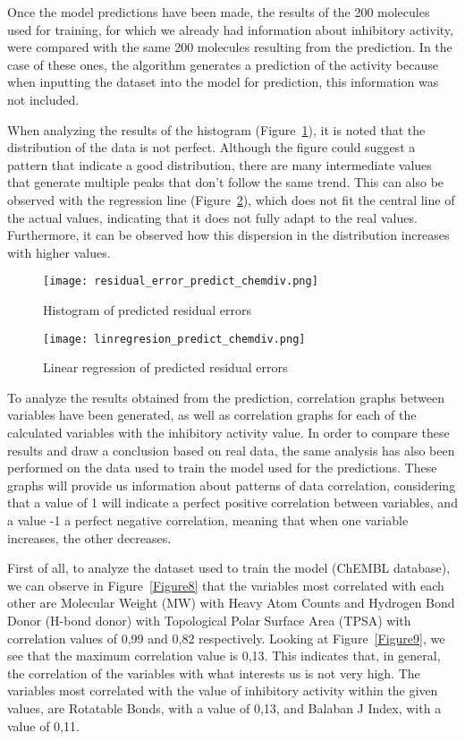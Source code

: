 \documentclass[final,times,twocolumn,article]{elsarticle}
\begin{document}
Once the model predictions have been made, the results of the 200 molecules used for training, for which we already had information about inhibitory activity, were compared with the same 200 molecules resulting from the prediction. In the case of these ones, the algorithm generates a prediction of the activity because when inputting the dataset into the model for prediction, this information was not included. 

When analyzing the results of the histogram (Figure~\ref{Figure6}), it is noted that the distribution of the data is not perfect. Although the figure could suggest a pattern that indicate a good distribution, there are many intermediate values that generate multiple peaks that don't follow the same trend. This can also be observed with the regression line (Figure~\ref{Figure7}), which does not fit the central line of the actual values, indicating that it does not fully adapt to the real values. Furthermore, it can be observed how this dispersion in the distribution increases with higher values. 

\begin{figure}[ht]
    \centering 
     \texttt{[image: residual\_error\_predict\_chemdiv.png]}	
     \caption{Histogram of predicted residual errors} 
     \label{Figure6}
 \end{figure}

 \begin{figure}[ht]
    \centering 
     \texttt{[image: linregresion\_predict\_chemdiv.png]}	
     \caption{Linear regression of predicted residual errors} 
     \label{Figure7}
 \end{figure}

 To analyze the results obtained from the prediction, correlation graphs between variables have been generated, as well as correlation graphs for each of the calculated variables with the inhibitory activity value. In order to compare these results and draw a conclusion based on real data, the same analysis has also been performed on the data used to train the model used for the predictions. These graphs will provide us information about patterns of data correlation, considering that a value of 1 will indicate a perfect positive correlation between variables, and a value -1 a perfect negative correlation, meaning that when one variable increases, the other decreases. 

 First of all, to analyze the dataset used to train the model (ChEMBL database), we can observe in Figure~\ref{Figure8} that the variables most correlated with each other are Molecular Weight (MW) with Heavy Atom Counts and Hydrogen Bond Donor (H-bond donor) with Topological Polar Surface Area (TPSA) with correlation values of 0,99 and 0,82 respectively. Looking at Figure~\ref{Figure9}, we see that the maximum correlation value is 0,13. This indicates that, in general, the correlation of the variables with what interests us is not very high. The variables most correlated with the value of inhibitory activity within the given values, are Rotatable Bonds, with a value of 0,13, and Balaban J Index, with a value of 0,11. 
\end{document}

